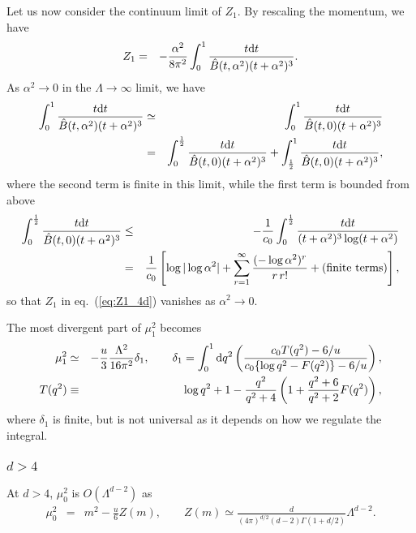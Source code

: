 \documentclass[preprint]{ptephy_v1}%
\newcommand{\rmd}{{\rm d}}
\begin{document}
Let us now consider the continuum limit of $Z_1$. 
By rescaling the momentum, we have
\begin{eqnarray}
Z_1 &= &  -\frac{\alpha^2}{8\pi^2}\int_0^1 \frac{t \rmd t}{\hat B(t,\alpha^2) (t+\alpha^2)^3} .
\label{eq:Z1_4d}
\end{eqnarray}  
As $\alpha^2\rightarrow 0$ in the $\Lambda\rightarrow\infty$ limit, we have 
\begin{eqnarray}
\int_0^1 \frac{ t \rmd t}{\hat B(t,\alpha^2) (t+\alpha^2)^3} &\simeq& \int_0^1 \frac{ t \rmd t}{\hat B(t,0) (t+\alpha^2)^3}\nonumber \\
&=&\int_0^{\frac12} \frac{ t \rmd t}{\hat B(t,0) (t+\alpha^2)^3} + \int_{\frac12}^{1} \frac{ t \rmd t}{\hat B(t,0) (t+\alpha^2)^3},
\end{eqnarray}
where the second term is finite in this limit, while the first term is bounded  from above
\begin{eqnarray}
\int_0^{\frac12} \frac{ t \rmd t}{\hat B(t,0) (t+\alpha^2)^3} &\le &
-\frac{1}{c_0} \int_0^{\frac12}\frac{t \rmd t}{(t+\alpha^2)^3 \log (t+\alpha^2)} \nonumber \\
&=&
\frac{1}{c_0} \left[ \log \vert \log \alpha^2 \vert +\sum_{r=1}^\infty \frac{ (-\log\alpha^2)^r}{r\, r!}
+\mbox{(finite terms)} \right],
\end{eqnarray}
so that $Z_1$ in eq.~(\ref{eq:Z1_4d}) vanishes as $\alpha^2\rightarrow 0$.

 
The most divergent part of $\mu_1^2$ becomes 
\begin{eqnarray}
\mu^2_1 &\simeq& -\frac{u}{3} \frac{\Lambda^2}{16\pi^2} \delta_1 , \qquad \delta_1 = \int_0^1 { \rmd q^2}\left(\frac{c_0 T(q^2)-6/u}{c_0\{\log q^2 -F(q^2) \} - 6/u}\right),\\
   T(q^2)&\equiv&  \log q^2 +1 -\frac{q^2}{q^2+4}\left( 1+\frac{q^2+6}{q^2+2} F(q^2) \right) ,  \nonumber
\end{eqnarray}
where $\delta_1$ is finite,  but is not universal as it depends on how we regulate the integral.

\subsubsection{$d > 4$}
At $d> 4$, $\mu_0^2$ is $O(\Lambda^{d-2})$ as
\begin{eqnarray}
\mu_0^2 &=& m^2-\frac{u}{6} Z(m), \qquad Z(m)\simeq 
 \frac{d}{ (4\pi)^{d/2}(d-2) \Gamma(1+d/2)}\Lambda^{d-2} .
\end{eqnarray} 
\end{document}
